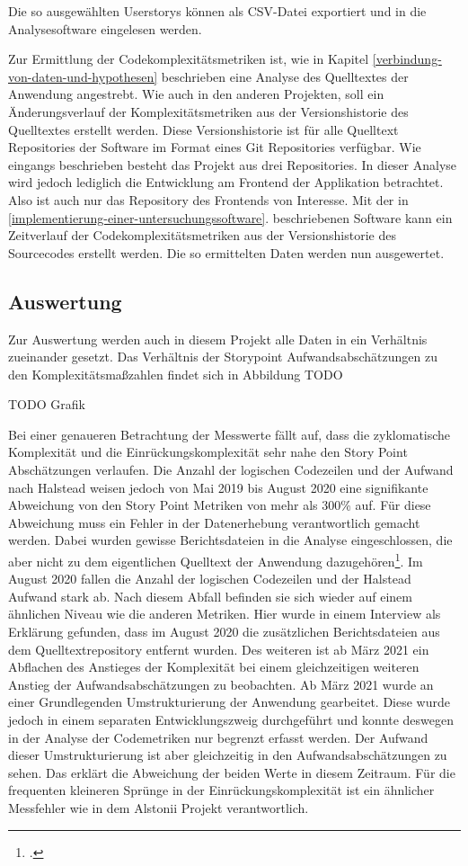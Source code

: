 Die so ausgewählten Userstorys können als CSV-Datei exportiert und in
die Analysesoftware eingelesen werden.

Zur Ermittlung der Codekomplexitätsmetriken ist, wie in Kapitel \ref{verbindung-von-daten-und-hypothesen}
beschrieben eine Analyse des Quelltextes der Anwendung angestrebt. Wie
auch in den anderen Projekten, soll ein Änderungsverlauf der
Komplexitätsmetriken aus der Versionshistorie des Quelltextes erstellt
werden. Diese Versionshistorie ist für alle Quelltext Repositories der
Software im Format eines Git Repositories verfügbar. Wie eingangs
beschrieben besteht das Projekt aus drei Repositories. In dieser Analyse
wird jedoch lediglich die Entwicklung am Frontend der Applikation
betrachtet. Also ist auch nur das Repository des Frontends von
Interesse. Mit der in \ref{implementierung-einer-untersuchungssoftware}. beschriebenen Software kann ein Zeitverlauf
der Codekomplexitätsmetriken aus der Versionshistorie des Sourcecodes
erstellt werden. Die so ermittelten Daten werden nun ausgewertet.

\subsection{Auswertung}\label{engelmannii-Auswertung}

Zur Auswertung werden auch in diesem Projekt alle Daten in ein
Verhältnis zueinander gesetzt. Das Verhältnis der Storypoint
Aufwandsabschätzungen zu den Komplexitätsmaßzahlen findet sich in
Abbildung TODO

TODO Grafik

Bei einer genaueren Betrachtung der Messwerte fällt auf, dass die
zyklomatische Komplexität und die Einrückungskomplexität sehr nahe den
Story Point Abschätzungen verlaufen. Die Anzahl der logischen Codezeilen
und der Aufwand nach Halstead weisen jedoch von Mai 2019 bis August 2020
eine signifikante Abweichung von den Story Point Metriken von mehr als
300\% auf. Für diese Abweichung muss ein Fehler in der Datenerhebung
verantwortlich gemacht werden. Dabei wurden gewisse Berichtsdateien in
die Analyse eingeschlossen, die aber nicht zu dem eigentlichen Quelltext
der Anwendung dazugehören\footcite[Vgl. ][]{stakeholdernInterviewMitStakeholdern2022}. Im August 2020
fallen die Anzahl der logischen Codezeilen und der Halstead Aufwand
stark ab. Nach diesem Abfall befinden sie sich wieder auf einem
ähnlichen Niveau wie die anderen Metriken. Hier wurde in einem Interview
als Erklärung gefunden, dass im August 2020 die zusätzlichen
Berichtsdateien aus dem Quelltextrepository entfernt wurden. Des
weiteren ist ab März 2021 ein Abflachen des Anstieges der Komplexität
bei einem gleichzeitigen weiteren Anstieg der Aufwandsabschätzungen zu
beobachten. Ab März 2021 wurde an einer Grundlegenden Umstrukturierung
der Anwendung gearbeitet. Diese wurde jedoch in einem separaten
Entwicklungszweig durchgeführt und konnte deswegen in der Analyse der
Codemetriken nur begrenzt erfasst werden. Der Aufwand dieser
Umstrukturierung ist aber gleichzeitig in den Aufwandsabschätzungen zu
sehen. Das erklärt die Abweichung der beiden Werte in diesem Zeitraum.
Für die frequenten kleineren Sprünge in der Einrückungskomplexität ist
ein ähnlicher Messfehler wie in dem Alstonii Projekt verantwortlich.


